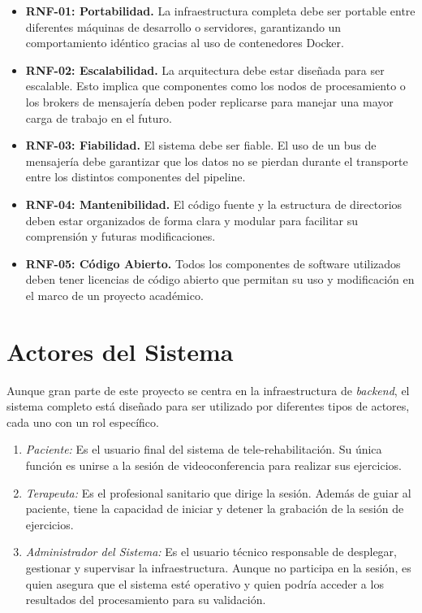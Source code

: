 \begin{itemize}
    \item \textbf{RNF-01: Portabilidad.} La infraestructura completa debe ser portable entre diferentes máquinas de desarrollo o servidores, garantizando un comportamiento idéntico gracias al uso de contenedores Docker.
    
    \item \textbf{RNF-02: Escalabilidad.} La arquitectura debe estar diseñada para ser escalable. Esto implica que componentes como los nodos de procesamiento o los brokers de mensajería deben poder replicarse para manejar una mayor carga de trabajo en el futuro.
    
    \item \textbf{RNF-03: Fiabilidad.} El sistema debe ser fiable. El uso de un bus de mensajería debe garantizar que los datos no se pierdan durante el transporte entre los distintos componentes del pipeline.
    
    \item \textbf{RNF-04: Mantenibilidad.} El código fuente y la estructura de directorios deben estar organizados de forma clara y modular para facilitar su comprensión y futuras modificaciones.
    
    \item \textbf{RNF-05: Código Abierto.} Todos los componentes de software utilizados deben tener licencias de código abierto que permitan su uso y modificación en el marco de un proyecto académico.
\end{itemize}

\section{Actores del Sistema}
\label{sec:actores}
Aunque gran parte de este proyecto se centra en la infraestructura de \textit{backend}, el sistema completo está diseñado para ser utilizado por diferentes tipos de actores, cada uno con un rol específico.

\begin{enumerate}
    \item \emph{Paciente:} Es el usuario final del sistema de tele-rehabilitación. Su única función es unirse a la sesión de videoconferencia para realizar sus ejercicios.
    \item \emph{Terapeuta:} Es el profesional sanitario que dirige la sesión. Además de guiar al paciente, tiene la capacidad de iniciar y detener la grabación de la sesión de ejercicios.
    \item \emph{Administrador del Sistema:} Es el usuario técnico responsable de desplegar, gestionar y supervisar la infraestructura. Aunque no participa en la sesión, es quien asegura que el sistema esté operativo y quien podría acceder a los resultados del procesamiento para su validación.
\end{enumerate}

